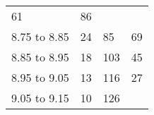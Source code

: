 \documentclass[]{article}
\begin{document}
\begin{longtable}[]{@{}llll@{}}
\begin{minipage}[t]{0.22\columnwidth}
61\strut
\end{minipage} & \begin{minipage}[t]{0.22\columnwidth}\raggedright
86\strut
\end{minipage}\tabularnewline
\begin{minipage}[t]{0.22\columnwidth}\raggedright
8.75 to 8.85\strut
\end{minipage} & \begin{minipage}[t]{0.22\columnwidth}\raggedright
24\strut
\end{minipage} & \begin{minipage}[t]{0.22\columnwidth}\raggedright
85\strut
\end{minipage} & \begin{minipage}[t]{0.22\columnwidth}\raggedright
69\strut
\end{minipage}\tabularnewline
\begin{minipage}[t]{0.22\columnwidth}\raggedright
8.85 to 8.95\strut
\end{minipage} & \begin{minipage}[t]{0.22\columnwidth}\raggedright
18\strut
\end{minipage} & \begin{minipage}[t]{0.22\columnwidth}\raggedright
103\strut
\end{minipage} & \begin{minipage}[t]{0.22\columnwidth}\raggedright
45\strut
\end{minipage}\tabularnewline
\begin{minipage}[t]{0.22\columnwidth}\raggedright
8.95 to 9.05\strut
\end{minipage} & \begin{minipage}[t]{0.22\columnwidth}\raggedright
13\strut
\end{minipage} & \begin{minipage}[t]{0.22\columnwidth}\raggedright
116\strut
\end{minipage} & \begin{minipage}[t]{0.22\columnwidth}\raggedright
27\strut
\end{minipage}\tabularnewline
\begin{minipage}[t]{0.22\columnwidth}\raggedright
9.05 to 9.15\strut
\end{minipage} & \begin{minipage}[t]{0.22\columnwidth}\raggedright
10\strut
\end{minipage} & \begin{minipage}[t]{0.22\columnwidth}\raggedright
126\strut

\end{minipage}
\end{longtable}
\end{document}
